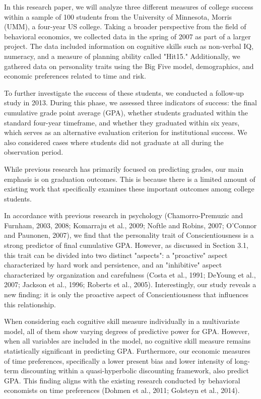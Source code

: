 \documentclass[12pt,a4paper]{article}
\begin{document}
In this research paper, we will analyze three different measures of college success within a sample of 100 students from the University of Minnesota, Morris (UMM), a four-year US college. Taking a broader perspective from the field of behavioral economics, we collected data in the spring of 2007 as part of a larger project. The data included information on cognitive skills such as non-verbal IQ, numeracy, and a measure of planning ability called "Hit15." Additionally, we gathered data on personality traits using the Big Five model, demographics, and economic preferences related to time and risk.

To further investigate the success of these students, we conducted a follow-up study in 2013. During this phase, we assessed three indicators of success: the final cumulative grade point average (GPA), whether students graduated within the standard four-year timeframe, and whether they graduated within six years, which serves as an alternative evaluation criterion for institutional success. We also considered cases where students did not graduate at all during the observation period.

While previous research has primarily focused on predicting grades, our main emphasis is on graduation outcomes. This is because there is a limited amount of existing work that specifically examines these important outcomes among college students.

In accordance with previous research in psychology (Chamorro-Premuzic and Furnham, 2003, 2008; Komarraju et al., 2009; Noftle and Robins, 2007; O'Connor and Paunonen, 2007), we find that the personality trait of Conscientiousness is a strong predictor of final cumulative GPA. However, as discussed in Section 3.1, this trait can be divided into two distinct "aspects": a "proactive" aspect characterized by hard work and persistence, and an "inhibitive" aspect characterized by organization and carefulness (Costa et al., 1991; DeYoung et al., 2007; Jackson et al., 1996; Roberts et al., 2005). Interestingly, our study reveals a new finding: it is only the proactive aspect of Conscientiousness that influences this relationship.

When considering each cognitive skill measure individually in a multivariate model, all of them show varying degrees of predictive power for GPA. However, when all variables are included in the model, no cognitive skill measure remains statistically significant in predicting GPA. Furthermore, our economic measures of time preferences, specifically a lower present bias and lower intensity of long-term discounting within a quasi-hyperbolic discounting framework, also predict GPA. This finding aligns with the existing research conducted by behavioral economists on time preferences (Dohmen et al., 2011; Golsteyn et al., 2014).
\end{document}
